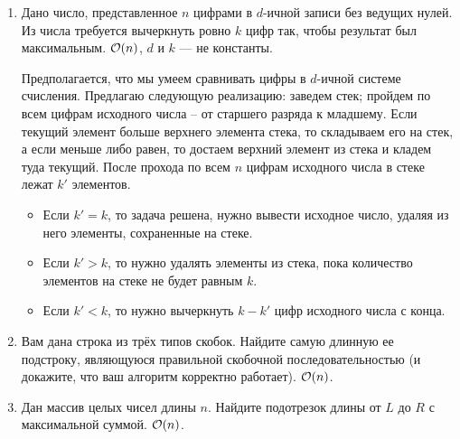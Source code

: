 \begin{enumerate}
  \item
    Дано число, представленное $n$ цифрами в $d$-ичной записи без
    ведущих нулей.  Из числа требуется вычеркнуть ровно $k$ цифр так,
    чтобы результат был максимальным. $\mathcal{O}(n)$, $d$ и $k$ --- не константы.
    \begin{solution}
      Предполагается, что мы умеем сравнивать цифры в $d$-ичной системе счисления. Предлагаю следующую реализацию: заведем стек; пройдем по всем цифрам исходного числа -- от старшего разряда к младшему. Если текущий элемент больше верхнего элемента стека, то складываем его на стек, а если меньше либо равен, то достаем верхний элемент из стека и кладем туда текущий. После прохода по всем $n$ цифрам исходного числа в стеке лежат $k'$ элементов.
      \begin{itemize}
        \item Если $k' = k$, то задача решена, нужно вывести исходное число, удаляя из него элементы, сохраненные на стеке.
        \item Если $k' > k$, то нужно удалять элементы из стека, пока количество элементов на стеке не будет равным $k$.
        \item Если $k' < k$, то нужно вычеркнуть $k - k'$ цифр исходного числа с конца.
      \end{itemize}
    \end{solution}
    
  \item {}
    Вам дана строка из трёх типов скобок. Найдите самую длинную ее
    подстроку, являющуюся правильной скобочной последовательностью
    (и докажите, что ваш алгоритм корректно работает). $\mathcal{O}(n)$.

  \item
    Дан массив целых чисел длины $n$. Найдите подотрезок длины
    от $L$ до $R$ с максимальной суммой. $\mathcal{O}(n)$.

    


\end{enumerate}
